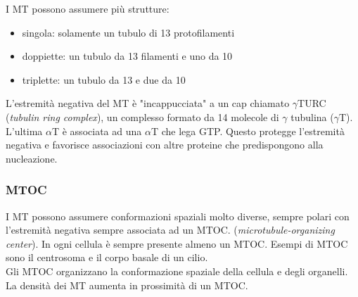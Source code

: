         I MT possono assumere più strutture:
        \begin{itemize}
            \item singola: solamente un tubulo di 13 protofilamenti
            \item doppiette: un tubulo da 13 filamenti e uno da 10 
            \item triplette: un tubulo da 13 e due da 10
        \end{itemize}
        L'estremità negativa del MT è "incappucciata" a un cap chiamato $\gamma$TURC (\textit{tubulin ring complex}), un complesso formato da 14 molecole di $\gamma$ tubulina ($\gamma$T). L'ultima $\alpha$T è associata ad una $\alpha$T che lega GTP.
        Questo protegge l'estremità negativa e favorisce associazioni con altre proteine che predispongono alla nucleazione.
        \subsubsection{MTOC}
            I MT possono assumere conformazioni spaziali molto diverse, sempre polari con l'estremità negativa sempre associata ad un MTOC. (\textit{microtubule-organizing center}). In ogni cellula è sempre presente almeno un MTOC. Esempi di MTOC sono il centrosoma e il corpo basale di un cilio.\\
            Gli MTOC organizzano la conformazione spaziale della cellula e degli organelli. La densità dei MT aumenta in prossimità di un MTOC.\\
            
